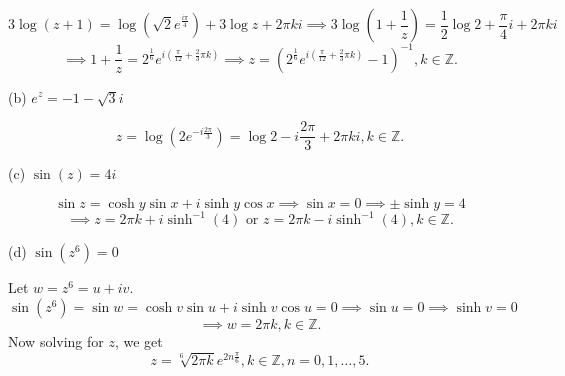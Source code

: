 \documentclass[letterpaper, reqno,11pt]{article}
\begin{document}
\[
3\log(z+1)=\log(\sqrt{2} e^{\frac{i\pi}{4}})+3\log z+2\pi ki\implies 3\log(1+\frac{1}{z})=\frac{1}{2}\log 2+\frac{\pi}{4}i+2\pi ki
\]
\[
\implies 1+\frac{1}{z}=2^{\frac{1}{6}}e^{i\left(\frac{\pi}{12}+\frac{2}{3}\pi k\right)}\implies z=\left(2^{\frac{1}{6}}e^{i\left(\frac{\pi}{12}+\frac{2}{3}\pi k\right)}-1\right)^{-1}, k\in\mathbb{Z}
.\]

(b) $ e^z= -1-\sqrt{3} i$

\[
z=\log\left( 2 e^{-i \frac{2\pi}{3}} \right)=\log 2-i \frac{2\pi}{3}+2\pi ki, k\in\mathbb{Z}
.\]


(c) $ \sin (z)= 4i$

\[
\sin z=\cosh y\sin x+i \sinh y\cos x\implies \sin x=0\implies \pm\sinh y=4
\]
\[
\implies z=2\pi k+i\sinh^{-1}(4)\text{ or }z=2\pi k-i\sinh^{-1}(4), k\in\mathbb{Z}
.\]

(d) $ \sin ( z^6)=0$

Let $w=z^{6}=u+iv$. 
\[
\sin(z^{6})=\sin w=\cosh v\sin u+i\sinh v\cos u=0\implies \sin u=0\implies \sinh v=0
\]
\[
\implies w=2\pi k, k\in\mathbb{Z}
.\]
Now solving for $z$, we get 
\[
z=\sqrt[6]{2\pi k}e^{2n\frac{\pi}{6}}, k\in\mathbb{Z}, n=0, 1, \ldots, 5
.\]
\end{document}

